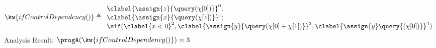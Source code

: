             \begin{example}
                \label{ex:ifValueDependency}
                \[
                \kw{ifControlDependency()} \triangleq 
                \begin{array}{l}
                    \clabel{ \assign{z}{\query(\chi[0])}}^{0} ; \\
                    \clabel{\assign{x}{\query(\chi[z])} }^{1} ; \\
                    \eif(\clabel{x < 0}^{2}, 
                    \clabel{\assign{y}{\query(\chi[0] + \chi[1])}}^{3}, 
                    \clabel{\assign{y}\query{(\chi[0])}}^{4})
                \end{array}
                \]
                Analysis Result: $ \progA( \kw{ifControlDependency()}) = 3$
                \end{example}
    
